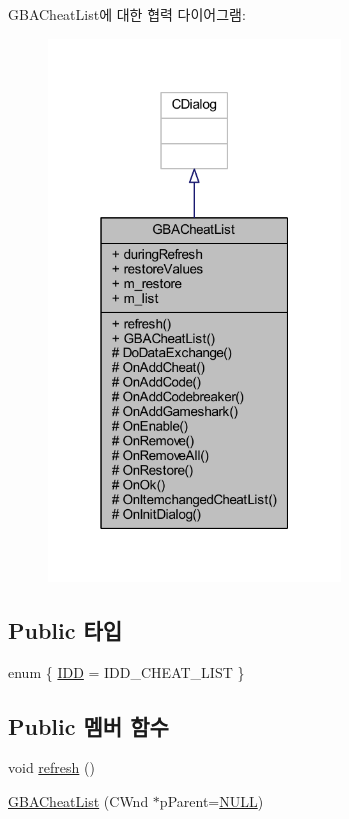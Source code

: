 G\+B\+A\+Cheat\+List에 대한 협력 다이어그램\+:\nopagebreak
\begin{figure}[H]
\begin{center}
\leavevmode
\includegraphics[width=220pt]{class_g_b_a_cheat_list__coll__graph}
\end{center}
\end{figure}
\subsection*{Public 타입}
\begin{DoxyCompactItemize}
\item 
enum \{ \mbox{\hyperlink{class_g_b_a_cheat_list_a5248aad32e8c4e9324c6921e0ff5bf73adf76e36e331d8dcfe67fbac8593caeed}{I\+DD}} = I\+D\+D\+\_\+\+C\+H\+E\+A\+T\+\_\+\+L\+I\+ST
 \}
\end{DoxyCompactItemize}
\subsection*{Public 멤버 함수}
\begin{DoxyCompactItemize}
\item 
void \mbox{\hyperlink{class_g_b_a_cheat_list_a12928bb674926ae02d5a3ceb156a3b53}{refresh}} ()
\item 
\mbox{\hyperlink{class_g_b_a_cheat_list_a0310a79ee81d4d26e02e347e1eacbf95}{G\+B\+A\+Cheat\+List}} (C\+Wnd $\ast$p\+Parent=\mbox{\hyperlink{_system_8h_a070d2ce7b6bb7e5c05602aa8c308d0c4}{N\+U\+LL}})
\end{DoxyCompactItemize}
